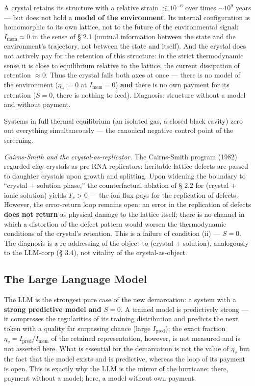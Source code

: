 \documentclass[pdflatex,sn-mathphys-ay]{sn-jnl}
\begin{document}
A crystal retains its structure with a relative strain \(\lesssim 10^{-6}\) over times \(\sim 10^9\) years --- but does not hold a \textbf{model of the environment}. Its internal configuration is homomorphic to its own lattice, not to the future of the environmental signal: \(I_{\text{mem}} \approx 0\) in the sense of § 2.1 (mutual information between the state and the environment's trajectory, not between the state and itself). And the crystal does not actively pay for the retention of this structure: in the strict thermodynamic sense it is close to equilibrium relative to the lattice, the current dissipation of retention \(\approx 0\). Thus the crystal fails both axes at once --- there is no model of the environment (\(\eta_v := 0\) at \(I_{\text{mem}} = 0\)) \textbf{and} there is no own payment for its retention (\(S = 0\), there is nothing to feed). Diagnosis: structure without a model and without payment.

Systems in full thermal equilibrium (an isolated gas, a closed black cavity) zero out everything simultaneously --- the canonical negative control point of the screening.

\emph{Cairns-Smith and the crystal-as-replicator.} The Cairns-Smith program (1982) regarded clay crystals as pre-RNA replicators: heritable lattice defects are passed to daughter crystals upon growth and splitting. Upon widening the boundary to ``crystal + solution phase,'' the counterfactual ablation of § 2.2 for (crystal + ionic solution) yields \(T_v > 0\) --- the ion flux pays for the replication of defects. However, the error-return loop remains open: an error in the replication of defects \textbf{does not return} as physical damage to the lattice itself; there is no channel in which a distortion of the defect pattern would worsen the thermodynamic conditions of the crystal's retention. This is a failure of condition (ii) --- \(S = 0\). The diagnosis is a re-addressing of the object to (crystal + solution), analogously to the LLM-corp (§ 3.4), not vitality of the crystal-as-object.

\subsection{The Large Language Model}\label{the-large-language-model}

The LLM is the strongest pure case of the new demarcation: a system with a \textbf{strong predictive model and \(S = 0\)}. A trained model is predictively strong --- it compresses the regularities of its training distribution and predicts the next token with a quality far surpassing chance (large \(I_{\text{pred}}\)); the exact fraction \(\eta_v = I_{\text{pred}}/I_{\text{mem}}\) of the retained representation, however, is not measured and is not asserted here. What is essential for the demarcation is not the value of \(\eta_v\) but the fact that the model exists and is predictive, whereas the loop of its payment is open. This is exactly why the LLM is the mirror of the hurricane: there, payment without a model; here, a model without own payment.
\end{document}

